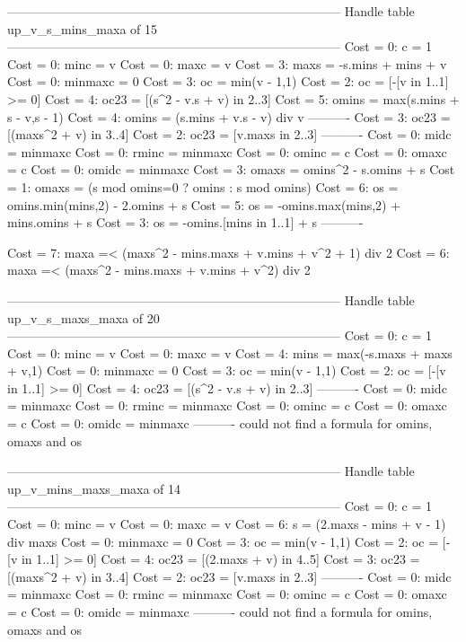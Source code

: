 --------------------------------------------------------------------------------
Handle table up_v_s_mins_maxa of 15
--------------------------------------------------------------------------------
Cost =  0:  c       = 1
Cost =  0:  minc    = v
Cost =  0:  maxc    = v
Cost =  3:  maxs    = -s.mins + mins + v
Cost =  0:  minmaxc = 0
Cost =  3:  oc      = min(v - 1,1)
Cost =  2:  oc      = [-[v in 1..1] >= 0]
Cost =  4:  oc23    = [(s^2 - v.s + v) in 2..3]
Cost =  5:  omins   = max(s.mins + s - v,s - 1)
Cost =  4:  omins   = (s.mins + v.s - v) div v
----------
Cost =  3:  oc23    = [(maxs^2 + v) in 3..4]
Cost =  2:  oc23    = [v.maxs in 2..3]
----------
Cost =  0:  midc    = minmaxc
Cost =  0:  rminc   = minmaxc
Cost =  0:  ominc   = c
Cost =  0:  omaxc   = c
Cost =  0:  omidc   = minmaxc
Cost =  3:  omaxs   = omins^2 - s.omins + s
Cost =  1:  omaxs   = (s mod omins=0 ? omins : s mod omins)
Cost =  6:  os      = omins.min(mins,2) - 2.omins + s
Cost =  5:  os      = -omins.max(mins,2) + mins.omins + s
Cost =  3:  os      = -omins.[mins in 1..1] + s
----------

Cost =  7:  maxa =< (maxs^2 - mins.maxs + v.mins + v^2 + 1) div 2
Cost =  6:  maxa =< (maxs^2 - mins.maxs + v.mins + v^2) div 2

--------------------------------------------------------------------------------
Handle table up_v_s_maxs_maxa of 20
--------------------------------------------------------------------------------
Cost =  0:  c       = 1
Cost =  0:  minc    = v
Cost =  0:  maxc    = v
Cost =  4:  mins    = max(-s.maxs + maxs + v,1)
Cost =  0:  minmaxc = 0
Cost =  3:  oc      = min(v - 1,1)
Cost =  2:  oc      = [-[v in 1..1] >= 0]
Cost =  4:  oc23    = [(s^2 - v.s + v) in 2..3]
----------
Cost =  0:  midc    = minmaxc
Cost =  0:  rminc   = minmaxc
Cost =  0:  ominc   = c
Cost =  0:  omaxc   = c
Cost =  0:  omidc   = minmaxc
----------
could not find a formula for omins, omaxs and os


--------------------------------------------------------------------------------
Handle table up_v_mins_maxs_maxa of 14
--------------------------------------------------------------------------------
Cost =  0:  c       = 1
Cost =  0:  minc    = v
Cost =  0:  maxc    = v
Cost =  6:  s       = (2.maxs - mins + v - 1) div maxs
Cost =  0:  minmaxc = 0
Cost =  3:  oc      = min(v - 1,1)
Cost =  2:  oc      = [-[v in 1..1] >= 0]
Cost =  4:  oc23    = [(2.maxs + v) in 4..5]
Cost =  3:  oc23    = [(maxs^2 + v) in 3..4]
Cost =  2:  oc23    = [v.maxs in 2..3]
----------
Cost =  0:  midc    = minmaxc
Cost =  0:  rminc   = minmaxc
Cost =  0:  ominc   = c
Cost =  0:  omaxc   = c
Cost =  0:  omidc   = minmaxc
----------
could not find a formula for omins, omaxs and os


